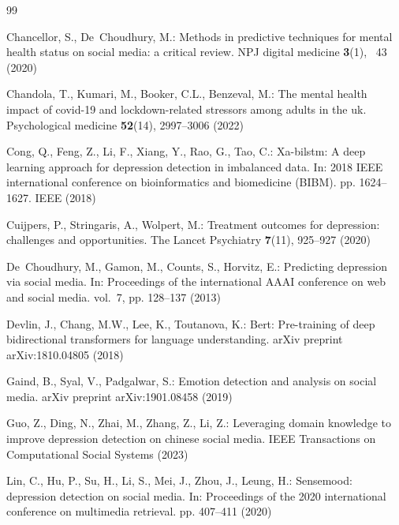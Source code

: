 \documentclass[runningheads]{llncs}
\begin{document}
%
%
%
% 
% 
%
\begin{thebibliography}{99}

Chancellor, S., De~Choudhury, M.: Methods in predictive techniques for mental
  health status on social media: a critical review. NPJ digital medicine
  \textbf{3}(1), ~43 (2020)

Chandola, T., Kumari, M., Booker, C.L., Benzeval, M.: The mental health impact
  of covid-19 and lockdown-related stressors among adults in the uk.
  Psychological medicine  \textbf{52}(14),  2997--3006 (2022)

Cong, Q., Feng, Z., Li, F., Xiang, Y., Rao, G., Tao, C.: Xa-bilstm: A deep
  learning approach for depression detection in imbalanced data. In: 2018 IEEE
  international conference on bioinformatics and biomedicine (BIBM). pp.
  1624--1627. IEEE (2018)

Cuijpers, P., Stringaris, A., Wolpert, M.: Treatment outcomes for depression:
  challenges and opportunities. The Lancet Psychiatry  \textbf{7}(11),
  925--927 (2020)

De~Choudhury, M., Gamon, M., Counts, S., Horvitz, E.: Predicting depression via
  social media. In: Proceedings of the international AAAI conference on web and
  social media. vol.~7, pp. 128--137 (2013)

Devlin, J., Chang, M.W., Lee, K., Toutanova, K.: Bert: Pre-training of deep
  bidirectional transformers for language understanding. arXiv preprint
  arXiv:1810.04805  (2018)

Gaind, B., Syal, V., Padgalwar, S.: Emotion detection and analysis on social
  media. arXiv preprint arXiv:1901.08458  (2019)

Guo, Z., Ding, N., Zhai, M., Zhang, Z., Li, Z.: Leveraging domain knowledge to
  improve depression detection on chinese social media. IEEE Transactions on
  Computational Social Systems  (2023)

Lin, C., Hu, P., Su, H., Li, S., Mei, J., Zhou, J., Leung, H.: Sensemood:
  depression detection on social media. In: Proceedings of the 2020
  international conference on multimedia retrieval. pp. 407--411 (2020)


\end{thebibliography}
\end{document}
